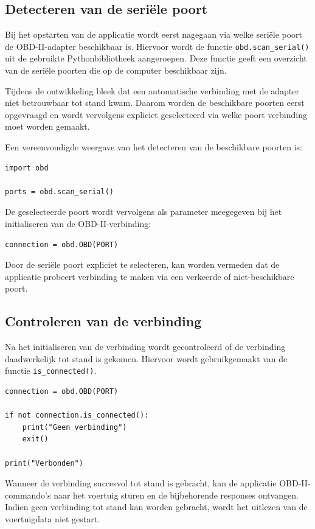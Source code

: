 \subsection{Detecteren van de seriële poort}
Bij het opstarten van de applicatie wordt eerst nagegaan via welke seriële poort
de OBD-II-adapter beschikbaar is. Hiervoor wordt de functie
\texttt{obd.scan\_serial()} uit de gebruikte Pythonbibliotheek aangeroepen.
Deze functie geeft een overzicht van de seriële poorten die op de computer
beschikbaar zijn.

Tijdens de ontwikkeling bleek dat een automatische verbinding met de adapter
niet betrouwbaar tot stand kwam. Daarom worden de beschikbare poorten eerst
opgevraagd en wordt vervolgens expliciet geselecteerd via welke poort verbinding
moet worden gemaakt.

Een vereenvoudigde weergave van het detecteren van de beschikbare poorten is:

\begin{verbatim}
import obd

ports = obd.scan_serial()
\end{verbatim}

De geselecteerde poort wordt vervolgens als parameter meegegeven bij het
initialiseren van de OBD-II-verbinding:

\begin{verbatim}
connection = obd.OBD(PORT)
\end{verbatim}

Door de seriële poort expliciet te selecteren, kan worden vermeden dat de
applicatie probeert verbinding te maken via een verkeerde of niet-beschikbare
poort.

\subsection{Controleren van de verbinding}
Na het initialiseren van de verbinding wordt gecontroleerd of de verbinding
daadwerkelijk tot stand is gekomen. Hiervoor wordt gebruikgemaakt van de
functie \texttt{is\_connected()}.

\begin{verbatim}
connection = obd.OBD(PORT)

if not connection.is_connected():
    print("Geen verbinding")
    exit()

print("Verbonden")
\end{verbatim}

Wanneer de verbinding succesvol tot stand is gebracht, kan de applicatie
OBD-II-commando's naar het voertuig sturen en de bijbehorende responses
ontvangen. Indien geen verbinding tot stand kan worden gebracht, wordt het
uitlezen van de voertuigdata niet gestart.

